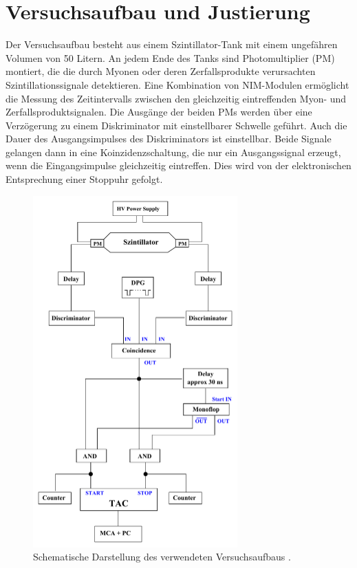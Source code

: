 \section{Versuchsaufbau und Justierung}

Der Versuchsaufbau besteht aus einem Szintillator-Tank mit einem ungefähren Volumen von 50 Litern. An jedem Ende des Tanks sind Photomultiplier (PM) montiert, die die durch Myonen oder deren Zerfallsprodukte verursachten Szintillationssignale detektieren. Eine Kombination von NIM-Modulen ermöglicht die Messung des Zeitintervalls zwischen den gleichzeitig eintreffenden Myon- und Zerfallsproduktsignalen. Die Ausgänge der beiden PMs werden über eine Verzögerung zu einem Diskriminator mit einstellbarer Schwelle geführt. Auch die Dauer des Ausgangsimpulses des Diskriminators ist einstellbar. Beide Signale gelangen dann in eine Koinzidenzschaltung, die nur ein Ausgangssignal erzeugt, wenn die Eingangsimpulse gleichzeitig eintreffen. Dies wird von der elektronischen Entsprechung einer Stoppuhr gefolgt.

\begin{figure}
    \centering
    \includegraphics[width=0.7\textwidth]{content/grafik/Aufbau.pdf}
    \caption{Schematische Darstellung des verwendeten Versuchsaufbaus \cite{myon}.}
    \label{fig:Aufbau}
\end{figure}

